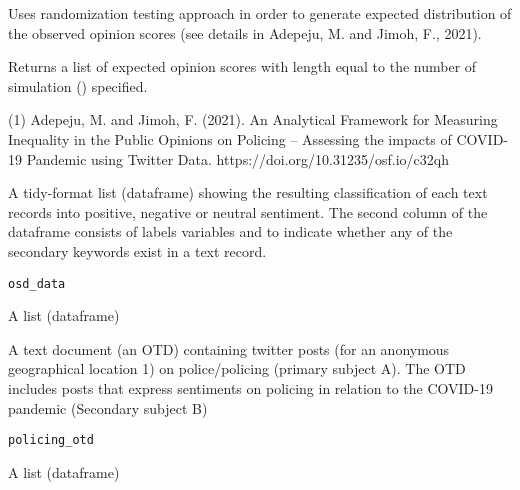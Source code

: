 \documentclass[a4paper]{book}
\begin{document}
%
\begin{Details}\relax
Uses randomization testing approach in
order to generate expected distribution of the observed
opinion scores (see details in Adepeju, M. and Jimoh, F., 2021).
\end{Details}
%
\begin{Value}
Returns a list of expected opinion scores with length equal
to the number of simulation () specified.
\end{Value}
%
\begin{References}\relax
(1) Adepeju, M. and Jimoh, F. (2021). An Analytical
Framework for Measuring Inequality in the Public Opinions on
Policing – Assessing the impacts of COVID-19 Pandemic using
Twitter Data. https://doi.org/10.31235/osf.io/c32qh
\end{References}
%
\begin{Description}\relax
A tidy-format list (dataframe) showing the resulting
classification of each text records into positive, negative
or neutral sentiment. The second column of the dataframe consists of
labels variables  and  to indicate whether any of the secondary
keywords exist in a text record.
\end{Description}
%
\begin{Usage}
\begin{verbatim}
osd_data
\end{verbatim}
\end{Usage}
%
\begin{Format}
A list (dataframe)
\end{Format}
%
\begin{Description}\relax
A text document (an OTD) containing twitter posts
(for an anonymous geographical location 1) on police/policing
(primary subject A). The OTD includes
posts that express sentiments on policing in relation to
the COVID-19 pandemic (Secondary subject B)
\end{Description}
%
\begin{Usage}
\begin{verbatim}
policing_otd
\end{verbatim}
\end{Usage}
%
\begin{Format}
A list (dataframe)
\end{Format}
\end{document}
